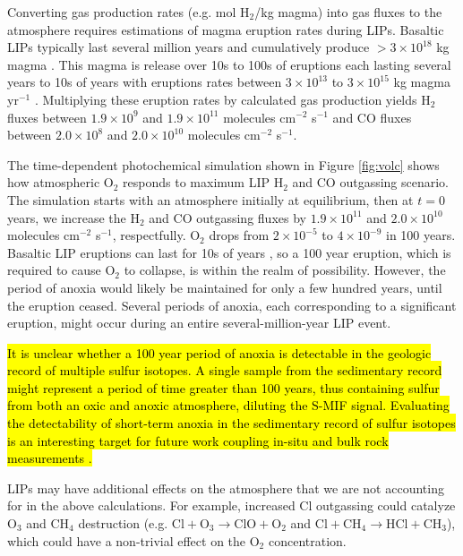 \documentclass[9pt,twoside,lineno]{pnas-new}
\begin{document}
Converting gas production rates (e.g. mol H$_2$/kg magma) into gas fluxes to the atmosphere requires estimations of magma eruption rates during LIPs. Basaltic LIPs typically last several million years and cumulatively produce $>3 \times 10^{18}$ kg magma \cite{Self_2015}. This magma is release over 10s to 100s of eruptions each lasting several years to 10s of years with eruptions rates between $3 \times 10^{13}$ to $3 \times 10^{15}$ kg magma yr$^{-1}$ \cite{Bryan_2010}. Multiplying these eruption rates by calculated gas production yields H$_2$ fluxes between $1.9 \times 10^9$ and $1.9 \times 10^{11}$ molecules cm$^{-2}$ s$^{-1}$ and CO fluxes between $2.0 \times 10^8$ and $2.0 \times 10^{10}$ molecules cm$^{-2}$ s$^{-1}$. 

The time-dependent photochemical simulation shown in Figure \ref{fig:volc} shows how atmospheric O$_2$ responds to maximum LIP H$_2$ and CO outgassing scenario. The simulation starts with an atmosphere initially at equilibrium, then at $t = 0$ years, we increase the H$_2$ and CO outgassing fluxes by $1.9 \times 10^{11}$ and $2.0 \times 10^{10}$ molecules cm$^{-2}$ s$^{-1}$, respectfully. O$_2$ drops from $2 \times 10^{-5}$ to $4 \times 10^{-9}$ in 100 years. Basaltic LIP eruptions can last for 10s of years \cite{Bryan_2010}, so a 100 year eruption, which is required to cause O$_2$ to collapse, is within the realm of possibility. However, the period of anoxia would likely be maintained for only a few hundred years, until the eruption ceased. Several periods of anoxia, each corresponding to a significant eruption, might occur during an entire several-million-year LIP event.

\hl{It is unclear whether a 100 year period of anoxia is detectable in the geologic record of multiple sulfur isotopes. A single sample from the sedimentary record might represent a period of time greater than 100 years, thus containing sulfur from both an oxic and anoxic atmosphere, diluting the S-MIF signal. Evaluating the detectability of short-term anoxia in the sedimentary record of sulfur isotopes is an interesting target for future work coupling in-situ and bulk rock measurements \mbox{\cite{Meyer_2017}}.}

LIPs may have additional effects on the atmosphere that we are not accounting for in the above calculations. For example, increased Cl outgassing could catalyze O$_3$ and CH$_4$ destruction (e.g. $\mathrm{Cl} + \mathrm{O_3} \rightarrow \mathrm{ClO} + \mathrm{O_2}$ and $\mathrm{Cl} + \mathrm{CH_4} \rightarrow \mathrm{HCl} + \mathrm{CH_3}$), which could have a non-trivial effect on the O$_2$ concentration.
\end{document}
